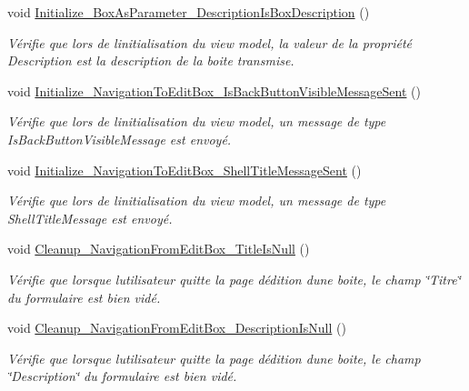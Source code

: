 \begin{DoxyCompactItemize}
void \hyperlink{class_boxes_1_1_tests_1_1_edit_box_view_model_tests_a5f14317bb959aecdada69b55fcd612a6}{Initialize\+\_\+\+Box\+As\+Parameter\+\_\+\+Description\+Is\+Box\+Description} ()
\begin{DoxyCompactList}\small\item\em Vérifie que lors de l\textquotesingle{}initialisation du view model, la valeur de la propriété {\ttfamily Description} est la description de la boite transmise. \end{DoxyCompactList}\item 
void \hyperlink{class_boxes_1_1_tests_1_1_edit_box_view_model_tests_a2f699c6bf0855cd12dec0c53a812634e}{Initialize\+\_\+\+Navigation\+To\+Edit\+Box\+\_\+\+Is\+Back\+Button\+Visible\+Message\+Sent} ()
\begin{DoxyCompactList}\small\item\em Vérifie que lors de l\textquotesingle{}initialisation du view model, un message de type Is\+Back\+Button\+Visible\+Message est envoyé. \end{DoxyCompactList}\item 
void \hyperlink{class_boxes_1_1_tests_1_1_edit_box_view_model_tests_a6272cedde5c1ca2336ed3611fc3ab692}{Initialize\+\_\+\+Navigation\+To\+Edit\+Box\+\_\+\+Shell\+Title\+Message\+Sent} ()
\begin{DoxyCompactList}\small\item\em Vérifie que lors de l\textquotesingle{}initialisation du view model, un message de type Shell\+Title\+Message est envoyé. \end{DoxyCompactList}\item 
void \hyperlink{class_boxes_1_1_tests_1_1_edit_box_view_model_tests_af2d1ead3ac5d37688e970fd5870f481d}{Cleanup\+\_\+\+Navigation\+From\+Edit\+Box\+\_\+\+Title\+Is\+Null} ()
\begin{DoxyCompactList}\small\item\em Vérifie que lorsque l\textquotesingle{}utilisateur quitte la page d\textquotesingle{}édition d\textquotesingle{}une boite, le champ \char`\"{}\+Titre\char`\"{} du formulaire est bien vidé. \end{DoxyCompactList}\item 
void \hyperlink{class_boxes_1_1_tests_1_1_edit_box_view_model_tests_a3002f5a03cbe5b6ca6bb2d71d0602288}{Cleanup\+\_\+\+Navigation\+From\+Edit\+Box\+\_\+\+Description\+Is\+Null} ()
\begin{DoxyCompactList}\small\item\em Vérifie que lorsque l\textquotesingle{}utilisateur quitte la page d\textquotesingle{}édition d\textquotesingle{}une boite, le champ \char`\"{}\+Description\char`\"{} du formulaire est bien vidé. \end{DoxyCompactList}\item 

\end{DoxyCompactItemize}
